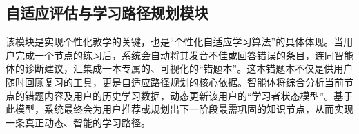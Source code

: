 \subsection{自适应评估与学习路径规划模块}
该模块是实现个性化教学的关键，也是“个性化自适应学习算法”的具体体现。当用户完成一个节点的练习后，系统会自动将其发音不佳或回答错误的条目，连同智能体的诊断建议，汇集成一本专属的、可视化的“错题本”。这本错题本不仅是供用户随时回顾复习的工具，更是自适应路径规划的核心依据。智能体将综合分析当前节点的错题内容及用户的历史学习数据，动态更新该用户的“学习者状态模型”。基于此模型，系统最终会为用户推荐或规划出下一阶段最需巩固的知识节点，从而实现一条真正动态、智能的学习路径。